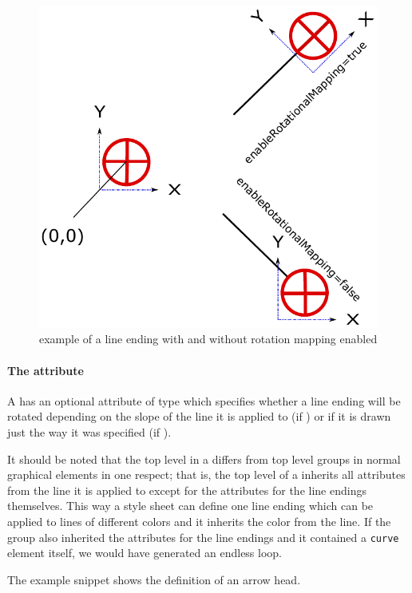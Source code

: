 \begin{figure}[!ht]
\begin{center}
\includegraphics{figures/EnableRotationalMapping.pdf}
\end{center}
\caption{example of a line ending with and without rotation mapping enabled}
\label{EnableRotationalMapping}
\end{figure}

\paragraph{The \fixttspace{} attribute}

A \LineEnding has an optional attribute 
of type  which specifies whether a line ending
will be rotated depending on the slope of the line it is applied to (if ) or if it is
drawn just the way it was specified (if ).


It should be noted that the top level \RenderGroup in a \LineEnding differs from top level groups in normal graphical elements in one respect; that is, the top level \RenderGroup of a \LineEnding inherits all attributes from the line it is applied to except for the attributes for the line endings themselves. This way a style sheet can define one line ending which can be applied to lines of different colors and it inherits the color from the line.
If the group also inherited the attributes for the line endings and it contained a \texttt{curve} element itself, we would have generated an endless loop.

The example snippet shows the definition of an arrow head.
\pagebreak
{}


